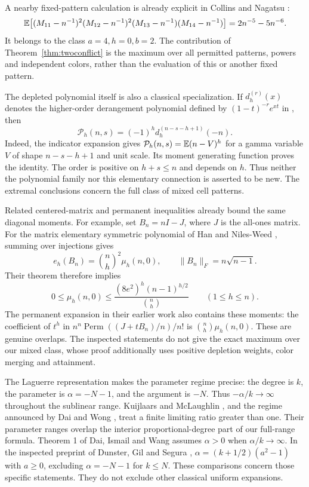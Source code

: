 A nearby fixed-pattern calculation is already explicit in Collins and Nagatsu \cite[Remark 7.2, page 478]{CN}:
\[
\mathbb E\bigl[(M_{11}-n^{-1})^2(M_{12}-n^{-1})^2
(M_{13}-n^{-1})(M_{14}-n^{-1})\bigr]
=2n^{-5}-5n^{-6}.
\]
It belongs to the class $a=4,h=0,b=2$. The contribution of Theorem~\ref{thm:twoconflict} is the maximum over all permitted patterns, powers and independent colors, rather than the evaluation of this or another fixed pattern.

The depleted polynomial itself is also a classical specialization. If $d_h^{(r)}(x)$ denotes the higher-order derangement polynomial defined by $(1-t)^{-r}e^{xt}$ in \cite[equation (2.22)]{KKJK}, then
\[
\mathcal P_h(n,s)=(-1)^h d_h^{(n-s-h+1)}(-n).
\]
Indeed, the indicator expansion gives $\mathcal P_h(n,s)=\mathbb E(n-V)^h$ for a gamma variable $V$ of shape $n-s-h+1$ and unit scale. Its moment generating function proves the identity. The order is positive on $h+s\le n$ and depends on $h$. Thus neither the polynomial family nor this elementary connection is asserted to be new. The extremal conclusions concern the full class of mixed cell patterns.

Related centered-matrix and permanent inequalities already bound the same diagonal moments. For example, set $B_n=nI-J$, where $J$ is the all-ones matrix. For the matrix elementary symmetric polynomial of Han and Niles-Weed \cite[equation (2), Theorem 1.2]{HNcentered}, summing over injections gives
\[
e_h(B_n)=\binom nh^2\mu_h(n,0),\qquad
\|B_n\|_F=n\sqrt{n-1}.
\]
Their theorem therefore implies
\[
0\le\mu_h(n,0)\le
\frac{(8e^2)^h(n-1)^{h/2}}{\binom nh}\qquad(1\le h\le n).
\]
The permanent expansion in their earlier work \cite[equation (29), Lemma 5.5 in the inspected preprint]{HNmixtures} also contains these moments: the coefficient of $t^h$ in
$n^n\operatorname{Perm}((J+tB_n)/n)/n!$ is $\binom nh\mu_h(n,0)$.
These are genuine overlaps. The inspected statements do not give the exact maximum over our mixed class, whose proof additionally uses positive depletion weights, color merging and attainment.

The Laguerre representation makes the parameter regime precise: the degree is $k$, the parameter is $\alpha=-N-1$, and the argument is $-N$. Thus $-\alpha/k\to\infty$ throughout the sublinear range. Kuijlaars and McLaughlin \cite[Theorem 7.1 and Remark 5.4]{KM}, and the regime announced by Dai and Wong \cite{DW}, treat a finite limiting ratio greater than one. Their parameter ranges overlap the interior proportional-degree part of our full-range formula. Theorem 1 of Dai, Ismail and Wang \cite{DIW} assumes $\alpha>0$ when $\alpha/k\to\infty$. In the inspected preprint of Dunster, Gil and Segura \cite[Section 1, equation (1.6) and Cases 1a, 1b and 2]{DGS}, $\alpha=(k+1/2)(a^2-1)$ with $a\ge0$, excluding $\alpha=-N-1$ for $k\le N$. These comparisons concern those specific statements. They do not exclude other classical uniform expansions.

